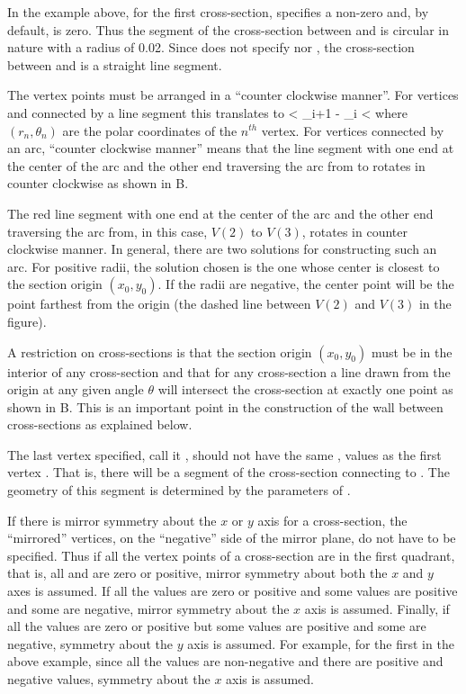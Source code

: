 In the example above, for the first cross-section, 
specifies a non-zero  and, by default, 
is zero. Thus the segment of the cross-section between  and
 is circular in nature with a radius of 0.02. Since 
does not specify  nor , the
cross-section between  and  is a straight line
segment.

The vertex points must be arranged in a ``counter clockwise manner''. 
For vertices  and  connected by a line segment
this translates to
 < \theta_{i+1} - \theta_{i} \pmod{2\pi} < \pi
\Endeq
where $(r_n, \theta_n)$ are the polar coordinates of the $n^{th}$
vertex. For vertices connected by an arc, ``counter clockwise manner''
means that the line segment with one end at the center of the arc and
the other end traversing the arc from  to 
rotates in counter clockwise as shown in
B. 

The red line segment with one end at the center of the arc and the
other end traversing the arc from, in this case, $V(2)$ to $V(3)$,
rotates in counter clockwise manner. In general, there are two
solutions for constructing such an arc. For positive radii, the
solution chosen is the one whose center is closest to the section
origin $(x_0, y_0)$. If the radii are negative, the center point will
be the point farthest from the origin (the dashed line between $V(2)$
and $V(3)$ in the figure).

A restriction on cross-sections is that the section origin $(x_0,
y_0)$ must be in the interior of any cross-section and that for any
cross-section a line drawn from the origin at any given angle $\theta$
will intersect the cross-section at exactly one point as shown in
B. This is an important point in the construction
of the wall between cross-sections as explained below.

The last vertex specified, call it , should not have the
same ,  values as the first vertex . That
is, there will be a segment of the cross-section connecting
 to . The geometry of this segment is determined
by the parameters of .

If there is mirror symmetry about the $x$ or $y$ axis for a
cross-section, the ``mirrored'' vertices, on the ``negative'' side of
the mirror plane, do not have to be specified. Thus if all the vertex
points of a cross-section are in the first quadrant, that is, all
 and  are zero or positive, mirror symmetry about both the
$x$ and $y$ axes is assumed. If all the  values are zero or
positive and some  values are positive and some are negative,
mirror symmetry about the $x$ axis is assumed. Finally, if all the
 values are zero or positive but some  values are
positive and some are negative, symmetry about the $y$ axis is
assumed. For example, for the first in the above example, since
all the  values are non-negative and there are positive and
negative  values, symmetry about the $x$ axis is assumed.

